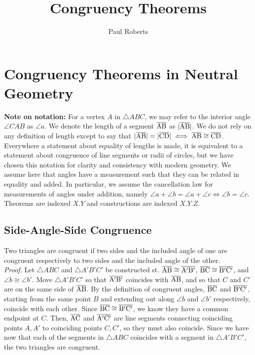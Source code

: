 \documentclass{report}
\title{Congruency Theorems}
\author{Paul Roberts}
\date{}
\begin{document}
\chapter{Congruency Theorems in Neutral Geometry}

\textbf{Note on notation:} For a vertex $A$ in $\triangle{ABC}$, we may refer to the interior angle $\angle CAB$ as $\angle a$. We denote the length of a segment $\overline{\rm AB}$ as $|\overline{\rm AB}|$. We do not rely on any definition of length except to say that $|\overline{\rm AB}| = |\overline{\rm CD}| \iff \overline{\rm AB} \cong \overline{\rm CD}$. Everywhere a statement about equality of lengths is made, it is equivalent to a statement about congruence of line segments or radii of circles, but we have chosen this notation for clarity and consistency with modern geometry. We assume here that angles have a measurement such that they can be related in equality and added. In particular, we assume the cancellation law for measurements of angles under addition, namely $\angle a + \angle b = \angle a + \angle c \iff \angle b = \angle c$.
\\[\baselineskip]Theorems are indexed $X.Y$ and constructions are indexed $X.Y.Z$.


\section{Side-Angle-Side Congruence}
\label{sec:SAS}
Two triangles are congruent if two sides and the included angle of one are congruent respectively to two sides and the included angle of the other.
\\[\baselineskip] \textit{Proof.} Let $\triangle{ABC}$ and $\triangle{A'B'C'}$ be constructed st. $\overline{\rm AB} \cong \overline{\rm A'B'}$, $\overline{\rm BC} \cong \overline{\rm B'C'}$, and $\angle b  \cong \angle b'$. Move $\triangle{A'B'C'}$ so that $\overline{\rm A'B'}$ coincides with $\overline{\rm AB}$, and so that $C$ and $C'$ are on the same side of $\overline{\rm AB}$. By the definition of congruent angles, $\overline{\rm BC}$ and $\overline{\rm B'C'}$, starting from the same point $B$ and extending out along $\angle b$ and $\angle b'$ respectively, coincide with each other. Since $\overline{\rm BC} \cong \overline{\rm B'C'}$, we know they have a common endpoint at $C$. Then, $\overline{\rm AC}$ and $\overline{\rm A'C'}$ are line segments connecting coinciding points $A, A'$ to coinciding points $C, C'$, so they must also coincide. Since we have now that each of the segments in $\triangle{ABC}$ coincides with a segment in $\triangle{A'B'C'}$, the two triangles are congruent.
\end{document}
